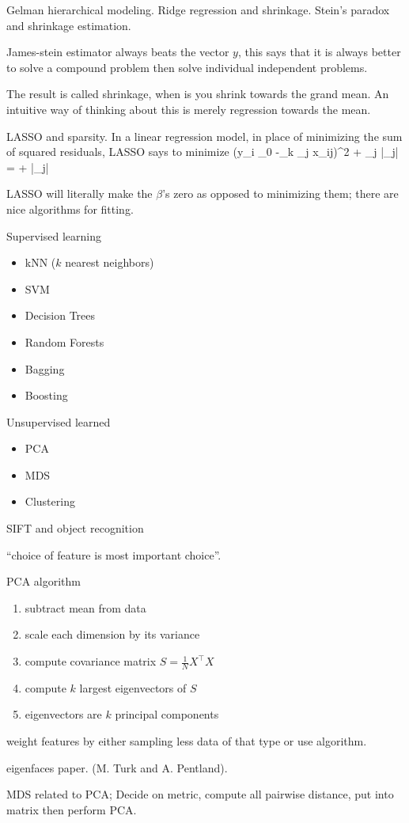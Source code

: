 Gelman hierarchical modeling.
Ridge regression and shrinkage.
Stein's paradox and shrinkage estimation.

James-stein estimator always beats the vector $y$,
this says that it is always better to solve a compound
problem then solve individual independent problems.

The result is called shrinkage, when is you shrink
towards the grand mean. An intuitive way of
thinking about this is merely regression towards
the mean.

LASSO and sparsity.
In a linear regression model, in place of minimizing
the sum of squared residuals, LASSO says to minimize
\beq
\sum (y_i \beta_0 -\sum_k \beta_j x_{ij})^2 + \lambda \sum_j |\beta_j| =  + \lambda \sum |\beta_j|
\eeq

LASSO will literally make the $\beta$'s zero as opposed to minimizing them;
there are nice algorithms for fitting.

Supervised learning
\begin{itemize}
\item kNN ($k$ nearest neighbors)
\item SVM
\item Decision Trees
\item Random Forests
\item Bagging
\item Boosting
\end{itemize}


Unsupervised learned
\begin{itemize}
\item PCA
\item MDS
\item Clustering
\end{itemize}

SIFT and object recognition

``choice of feature is most important choice''.

PCA algorithm
\begin{enumerate}
\item subtract mean from data
\item scale each dimension by its variance
\item compute covariance matrix $S = \frac{1}{N}X^{\top}X$
\item compute $k$ largest eigenvectors of $S$
\item eigenvectors are $k$ principal components
\end{enumerate}

weight features by either sampling less data of
that type or use algorithm.

eigenfaces paper. (M. Turk and A. Pentland).

MDS related to PCA; Decide on metric,
compute all pairwise distance, put into
matrix then perform PCA.


